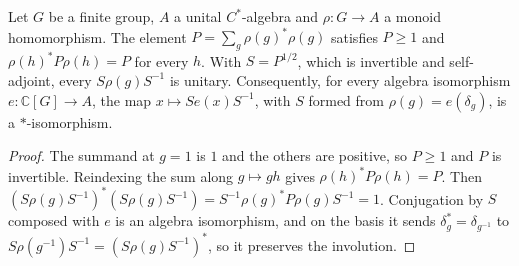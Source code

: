 \begin{lemma}\label{lem:finite-group-unitary-trick}
\leanok
{}
Let $G$ be a finite group, $A$ a unital $C^*$-algebra and $\rho:G\to A$ a
monoid homomorphism. The element $P=\sum_g\rho(g)^*\rho(g)$ satisfies $P\ge1$
and $\rho(h)^*P\rho(h)=P$ for every $h$. With $S=P^{1/2}$, which is invertible
and self-adjoint, every $S\rho(g)S^{-1}$ is unitary. Consequently, for every
algebra isomorphism $e:\mathbb C[G]\to A$, the map $x\mapsto Se(x)S^{-1}$, with
$S$ formed from $\rho(g)=e(\delta_g)$, is a $*$-isomorphism.
\end{lemma}
\begin{proof}
\leanok
The summand at $g=1$ is $1$ and the others are positive, so $P\ge1$ and $P$ is
invertible. Reindexing the sum along $g\mapsto gh$ gives $\rho(h)^*P\rho(h)=P$.
Then $(S\rho(g)S^{-1})^*(S\rho(g)S^{-1})=S^{-1}\rho(g)^*P\rho(g)S^{-1}=1$.
Conjugation by $S$ composed with $e$ is an algebra isomorphism, and on the
basis it sends $\delta_g^*=\delta_{g^{-1}}$ to
$S\rho(g^{-1})S^{-1}=(S\rho(g)S^{-1})^*$, so it preserves the involution.
\end{proof}


